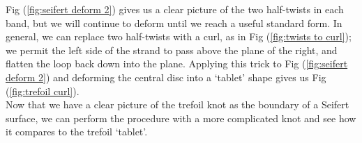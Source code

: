 \documentclass{article}
\begin{document}
{Fig (\ref{fig:seifert deform 2}) gives us a clear picture of the two half-twists in each band, but we will continue to deform until we reach a useful standard form. In general, we can replace two half-twists with a curl, as in Fig (\ref{fig:twists to curl}); we permit the left side of the strand to pass above the plane of the right, and flatten the loop back down into the plane. Applying this trick to Fig (\ref{fig:seifert deform 2}) and deforming the central disc into a `tablet' shape gives us Fig (\ref{fig:trefoil curl}).\\

Now that we have a clear picture of the trefoil knot as the boundary of a Seifert surface, we can perform the procedure with a more complicated knot and see how it compares to the trefoil `tablet'.\\

}
\end{document}
